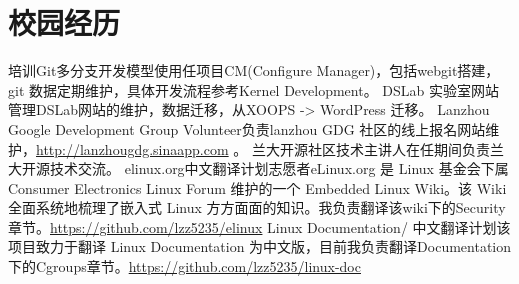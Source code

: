 \documentclass[11pt,a4paper]{moderncv}
\begin{document}
\section{校园经历} %
{培训Git多分支开发模型使用}{}{}{}{任项目CM(Configure Manager)，包括webgit搭建，git 数据定期维护，具体开发流程参考Kernel Development。}
{DSLab 实验室网站管理}{}{}{}{DSLab网站的维护，数据迁移，从XOOPS -> WordPress 迁移。}
{Lanzhou Google Development Group Volunteer}{}{}{}{负责lanzhou GDG 社区的线上报名网站维护，\url{http://lanzhougdg.sinaapp.com} 。}
{兰大开源社区技术主讲人}{}{}{}{在任期间负责兰大开源技术交流。}
{elinux.org中文翻译计划志愿者}{}{}{}{eLinux.org 是 Linux 基金会下属 Consumer Electronics 
Linux Forum 维护的一个 Embedded Linux Wiki。该 Wiki 全面系统地梳理了嵌入式 Linux 方方面面的知识。我负责翻译该wiki下的Security章节。\url{https://github.com/lzz5235/elinux}}
{Linux Documentation/ 中文翻译计划}{}{}{}{该项目致力于翻译 Linux Documentation 为中文版，目前我负责翻译Documentation下的Cgroups章节。\url{https://github.com/lzz5235/linux-doc}}

\closesection{}                   %
\renewcommand{\listitemsymbol}{-} %

\nocite{*}


\end{document}
